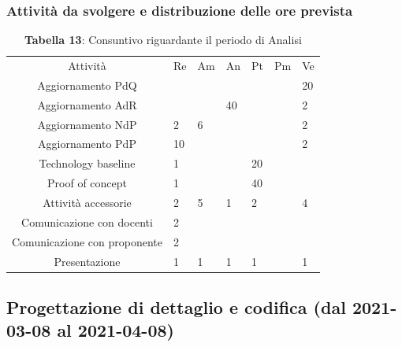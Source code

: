 \subsubsection{Attività da svolgere e distribuzione delle ore prevista}
\begin{table}[H]
	\centering
	\renewcommand{\arraystretch}{1.5}
	\begin{tabular}{|c|p{10mm}|p{10mm}|p{10mm}|p{10mm}|p{10mm}|p{10mm}|}
		\hline
		\rowcolor{lighter-grayer}
		Attività & Re & Am & An & Pt & Pm & Ve \\
		Aggiornamento PdQ     &  	&   &    &    &  & 20 \\
		Aggiornamento AdR     &  	&   & 40 &    &  & 2  \\
		Aggiornamento NdP     & 2	& 6 &    &    &  & 2  \\
		Aggiornamento PdP     & 10	&   &    &    &  & 2  \\
		Technology baseline   & 1	&   &    & 20 &  &    \\
		Proof of concept      & 1	&   &    & 40 &  &    \\
		Attività accessorie   & 2& 5 & 1  & 2  &  & 4  \\
		Comunicazione con docenti               & 2&   &    &    &  &    \\
		Comunicazione con proponente            & 2&   &    &    &  &    \\
		Presentazione         & 1& 1 & 1  & 1  &  & 1 \\
		\hline
	\end{tabular}
	\caption*{\textbf{Tabella 13}: Consuntivo riguardante il periodo di Analisi\\}
\end{table}


\subsection{Progettazione di dettaglio e codifica (dal 2021-03-08 al 2021-04-08)}


